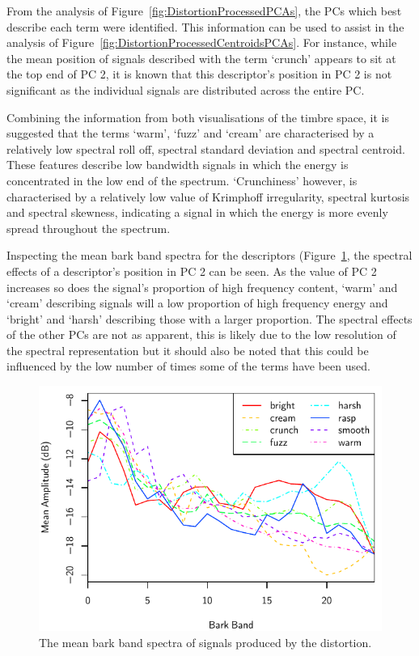			From the analysis of Figure~\ref{fig:DistortionProcessedPCAs}, the PCs which best describe each
			term were identified. This information can be used to assist in the analysis of
			Figure~\ref{fig:DistortionProcessedCentroidsPCAs}. For instance, while the mean position of signals
			described with the term `crunch' appears to sit at the top end of PC 2, it is known that this
			descriptor's position in PC 2 is not significant as the individual signals are distributed across
			the entire PC.

			Combining the information from both visualisations of the timbre space, it is suggested that the
			terms `warm', `fuzz' and `cream' are characterised by a relatively low spectral roll off, spectral
			standard deviation and spectral centroid. These features describe low bandwidth signals in which
			the energy is concentrated in the low end of the spectrum. `Crunchiness' however, is characterised
			by a relatively low value of Krimphoff irregularity, spectral kurtosis and spectral skewness,
			indicating a signal in which the energy is more evenly spread throughout the spectrum.

			Inspecting the mean bark band spectra for the descriptors
			(Figure~\ref{fig:DistortionProcessedSpectra}, the spectral effects of a descriptor's position in PC
			2 can be seen. As the value of PC 2 increases so does the signal's proportion of high frequency
			content, `warm' and `cream' describing signals will a low proportion of high frequency energy and
			`bright' and `harsh' describing those with a larger proportion. The spectral effects of the other
			PCs are not as apparent, this is likely due to the low resolution of the spectral representation
			but it should also be noted that this could be influenced by the low number of times some of the
			terms have been used.

			\begin{figure}[h!]
				\centering
				\includegraphics{chapter4/Images/DistortionProcessedSpectra.pdf}
				\caption{The mean bark band spectra of signals produced by the distortion.}
				\label{fig:DistortionProcessedSpectra}
			\end{figure}

